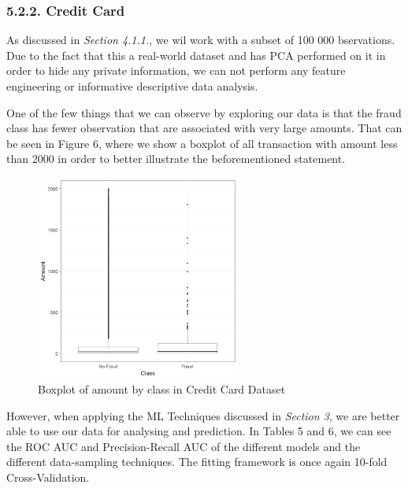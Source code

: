 \documentclass[12pt,]{article}
\begin{document}
\hypertarget{credit-card}{%
\subsubsection{5.2.2. Credit Card}\label{credit-card}}

As discussed in \emph{Section 4.1.1.}, we wil work with a subset of 100
000 bservations. Due to the fact that this a real-world dataset and has
PCA performed on it in order to hide any private information, we can not
perform any feature engineering or informative descriptive data
analysis.

One of the few things that we can observe by exploring our data is that
the fraud class has fewer observation that are associated with very
large amounts. That can be seen in Figure 6, where we show a boxplot of
all transaction with amount less than 2000 in order to better illustrate
the beforementioned statement.

\begin{figure}
\centering
\includegraphics[width=0.6\textwidth,height=\textheight]{figures/credit/descriptive/cr_card_fraud_amount_boxplot.png}
\caption{Boxplot of amount by class in Credit Card Dataset}
\end{figure}

However, when applying the ML Techniques discussed in \emph{Section 3},
we are better able to use our data for analysing and prediction. In
Tables 5 and 6, we can see the ROC AUC and Precision-Recall AUC of the
different models and the different data-sampling techniques. The fitting
framework is once again 10-fold Cross-Validation.
\end{document}
